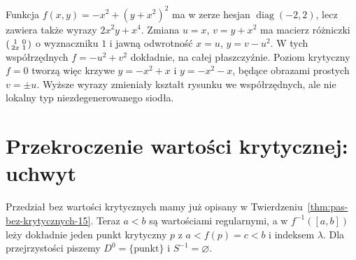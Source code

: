 \begin{przyklad}
\label{prz:morse-zakrzywione-siodlo-22}
Funkcja $f(x,y)=-x^2+(y+x^2)^2$
ma w zerze hesjan $\operatorname{diag}(-2,2)$,
lecz zawiera także wyrazy $2x^2y+x^4$.
Zmiana $u=x$, $v=y+x^2$ ma macierz różniczki
$\begin{psmallmatrix}1&0\\2x&1\end{psmallmatrix}$
o wyznaczniku $1$ i jawną odwrotność
$x=u$, $y=v-u^2$. W tych współrzędnych
$f=-u^2+v^2$ dokładnie, na całej płaszczyźnie.
Poziom krytyczny $f=0$ tworzą więc krzywe
$y=-x^2+x$ i $y=-x^2-x$, będące obrazami prostych $v=\pm u$.
Wyższe wyrazy zmieniały kształt rysunku we współrzędnych,
ale nie lokalny typ niezdegenerowanego siodła.

\begin{center}
\end{center}
\end{przyklad}

\section{Przekroczenie wartości krytycznej: uchwyt}
\label{sec:uchwyt-morse-17}

Przedział bez wartości krytycznych mamy już
opisany w Twierdzeniu~\ref{thm:pas-bez-krytycznych-15}.
Teraz $a<b$ są wartościami regularnymi,
a w $f^{-1}([a,b])$ leży dokładnie jeden
punkt krytyczny $p$ z $a<f(p)=c<b$ i indeksem
$\lambda$. Dla przejrzystości
piszemy $D^0=\{\mathrm{punkt}\}$
i $S^{-1}=\varnothing$.

